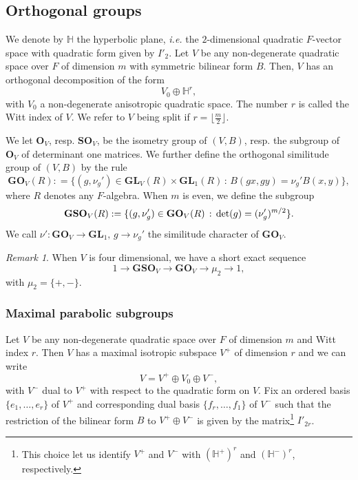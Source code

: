 \documentclass[11pt, reqno]{amsart}
\theoremstyle{plain}
\theoremstyle{definition}
\theoremstyle{remark}
\newtheorem{remark}[theorem]{Remark}
\theoremstyle{plain}
\def\GL{\mathbf{GL}}
\begin{document}
\subsection{Orthogonal groups}

We denote by $\mathbb{H}$ the hyperbolic plane, \textit{i.e.} the $2$-dimensional quadratic $F$-vector space with quadratic form given by $I'_2$.
Let $V$ be any non-degenerate quadratic space over $F$ of dimension $m$ with symmetric bilinear form $B$. Then, $V$ has an orthogonal decomposition of the form $$V_0 \oplus \mathbb{H}^r,$$
with $V_0$ a non-degenerate anisotropic quadratic space. The number $r$ is called the Witt index of $V$. We refer to $V$ being split if $r =  \lfloor \tfrac{m}{2} \rfloor$.

We let $\mathbf{O}_V$, resp. $\mathbf{SO}_V$, be the isometry group of $(V,B)$, resp. the subgroup of 
$\mathbf{O}_V$ of determinant one matrices. We further define the orthogonal similitude group of $(V,B)$ by the rule 
$$\mathbf{GO}_V(R) : = \{ (g,\nu_g') \in \GL_V(R) \times \GL_1(R) \,:\, B(g x,gy) = \nu_g' B(x,y) \},$$
\noindent where $R$ denotes any $F$-algebra. When $m$ is even, we define the subgroup 
$$\mathbf{GSO}_V(R) : = \{ (g,\nu_g') \in \mathbf{GO}_V(R) \,:\, {\rm det}(g) = (\nu_g')^{m/2} \}.$$
We call $ \nu' : \mathbf{GO}_V \to \GL_1, \, g \to \nu_g'$ the similitude character of $\mathbf{GO}_V$.

\begin{remark}
   When $V$ is four dimensional, we have a short exact sequence 
\[1 \to  \mathbf{GSO}_V \to \mathbf{GO}_V \to \mu_2 \to 1,\]
with $\mu_2 = \{ +,-\}$.
\end{remark}
\subsubsection{Maximal parabolic subgroups}\label{subsec:Parabolics:GSO}
Let $V$ be any non-degenerate quadratic space over $F$ of dimension $m$ and Witt index $r$. Then $V$ has a maximal isotropic subspace $V^+$ of dimension $r$ and we can write 
$$V = V^+ \oplus V_0 \oplus V^-,$$
with $V^-$ dual to $V^+$ with respect to the quadratic form on $V$. Fix an ordered basis $\{e_1, \dots, e_r \}$ of $V^+$ and corresponding dual basis $\{f_r, \dots, f_1 \}$ of $V^-$ such that the restriction of the bilinear form $B$ to $V^+ \oplus V^-$ is given by the matrix\footnote{This choice let us identify $V^+$ and $V^-$ with $(\mathbb{H}^+)^r$ and $(\mathbb{H}^-)^r$, respectively.} $I'_{2r}$. 
\end{document}
